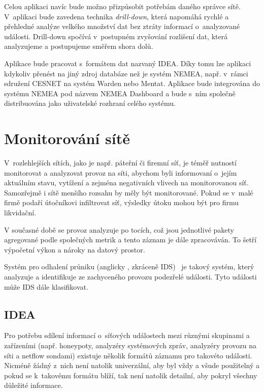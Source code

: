 Celou aplikaci navíc bude možno přizpůsobit potřebám daného správce sítě. V~aplikaci bude zavedena technika {\it drill-down}, která napomáhá rychlé a přehledné analýze velkého množství dat bez ztráty informací o~analyzované události. Drill-down spočívá v~postupném zvyšování rozlišení dat, která analyzujeme a postupujeme směřem shora dolů.

Aplikace bude pracovat s~formátem dat nazvaný IDEA. Díky tomu lze aplikaci kdykoliv přenést na jiný zdroj databáze než je systém NEMEA, např. v~rámci sdružení CESNET na systém Warden nebo Mentat. Aplikace bude integrována do systému NEMEA pod názvem NEMEA Dashboard a bude s~ním společně distribuována jako uživatelské rozhraní celého systému.

\chapter{Monitorování sítě}

V~rozlehlejších sítích, jako je např. páteřní či firemní síť, je téměř nutností monitorovat a analyzovat provoz na síti, abychom byli informovaní o~jejím aktuálním stavu, vytížení a zejména negativních vlivech na monitorovanou síť. Samozřejmě i sítě menšího rozsahu by měly být monitorované. Pokud se v~malé firmě podaří útočníkovi infiltrovat síť, výsledky útoku mohou být pro firmu likvidační.

V současné době se provoz analyzuje po tocích, což jsou jednotlivé pakety agregované podle společných metrik a tento záznam je dále zpracováván. To šetří výpočetní výkon a nároky na datový prostor.

Systém pro odhalení průniku (anglicky , zkráceně IDS)~\cite{idsips} je takový systém, který analyzuje a identifikuje ze zachyceného provozu podezřelé události. Tyto události může IDS dále klasifikovat. 

\section{IDEA}
\label{sec:idea}

Pro potřebu sdílení informací o~síťových událostech mezi různými skupinami a zařízeními (např. honeypoty, analyzéry systémových zpráv, analyzéry provozu na síti a netflow sondami) existuje několik formátů záznamu pro takovéto události. Nicméně žádný z~nich není natolik univerzální, aby byl vždy a všude použitelný a pokud se k~takovému formátu blíží, tak není natolik detailní, aby pokryl všechny důležité informace.

